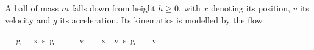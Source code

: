 \documentclass[envcountsame,envcountsect]{llncs}
\begin{document}
\begin{example}\label{ex:ball-hoare}
  A ball of mass $m$ falls down from height $h\geq 0$, with
  $x$ denoting its position, $v$ its velocity and $g$ its
  acceleration. Its kinematics is modelled by the flow
\begin{isabellebody}
\isanewline
{}\ %
{\isachardoublequoteopen}{\isasymphi}\ g\ {\isasymtau}\ {\isasymequiv}\ {\isacharbrackleft}x\ {\isasymmapsto}\isactrlsub s\ g\ {\isasymcdot}\ {\isasymtau}\ {\isacharcircum}\ {}{\isacharslash}{}\ {\isacharplus}\ v\ {\isasymcdot}\ {\isasymtau}\ {\isacharplus}\ x{\isacharcomma}\ \ v\ {\isasymmapsto}\isactrlsub s\ g\ {\isasymcdot}\ {\isasymtau}\ {\isacharplus}\ v{\isacharbrackright}{\isachardoublequoteclose}\isanewline
\end{isabellebody}


\end{example}
\end{document}

